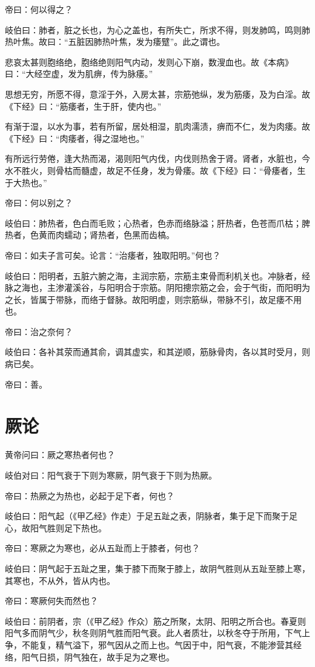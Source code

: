 \documentclass{article}%
\begin{document}
帝曰：何以得之？

岐伯曰：肺者，脏之长也，为心之盖也，有所失亡，所求不得，则发肺鸣，鸣则肺热叶焦。故曰：“五脏因肺热叶焦，发为痿躄”。此之谓也。

悲哀太甚则胞络绝，胞络绝则阳气内动，发则心下崩，数溲血也。故《本病》曰：“大经空虚，发为肌痹，传为脉痿。”

思想无穷，所愿不得，意淫于外，入房太甚，宗筋弛纵，发为筋痿，及为白淫。故《下经》曰：“筋痿者，生于肝，使内也。”

有渐于湿，以水为事，若有所留，居处相湿，肌肉濡渍，痹而不仁，发为肉痿。故《下经》曰：“肉痿者，得之湿地也。”

有所远行劳倦，逢大热而渴，渴则阳气内伐，内伐则热舍于肾。肾者，水脏也，今水不胜火，则骨枯而髓虚，故足不任身，发为骨痿。故《下经》曰：“骨痿者，生于大热也。”

帝曰：何以别之？

岐伯曰：肺热者，色白而毛败；心热者，色赤而络脉溢；肝热者，色苍而爪枯；脾热者，色黄而肉蠕动；肾热者，色黑而齿槁。

帝曰：如夫子言可矣。论言：“治痿者，独取阳明。”何也？

岐伯曰：阳明者，五脏六腑之海，主润宗筋，宗筋主束骨而利机关也。冲脉者，经脉之海也，主渗灌溪谷，与阳明合于宗筋。阴阳摠宗筋之会，会于气街，而阳明为之长，皆属于带脉，而络于督脉。故阳明虚，则宗筋纵，带脉不引，故足痿不用也。

帝曰：治之奈何？

岐伯曰：各补其荥而通其俞，调其虚实，和其逆顺，筋脉骨肉，各以其时受月，则病已矣。

帝曰：善。
\section{厥论}
黄帝问曰：厥之寒热者何也？

岐伯对曰：阳气衰于下则为寒厥，阴气衰于下则为热厥。

帝曰：热厥之为热也，必起于足下者，何也？

岐伯曰：阳气起（《甲乙经》作走）于足五趾之表，阴脉者，集于足下而聚于足心，故阳气胜则足下热也。

帝曰：寒厥之为寒也，必从五趾而上于膝者，何也？

岐伯曰：阴气起于五趾之里，集于膝下而聚于膝上，故阴气胜则从五趾至膝上寒，其寒也，不从外，皆从内也。

帝曰：寒厥何失而然也？

岐伯曰：前阴者，宗（《甲乙经》作众）筋之所聚，太阴、阳明之所合也。春夏则阳气多而阴气少，秋冬则阴气胜而阳气衰。此人者质壮，以秋冬夺于所用，下气上争，不能复，精气溢下，邪气因从之而上也。气因于中，阳气衰，不能渗营其经络，阳气日损，阴气独在，故手足为之寒也。
\end{document}
